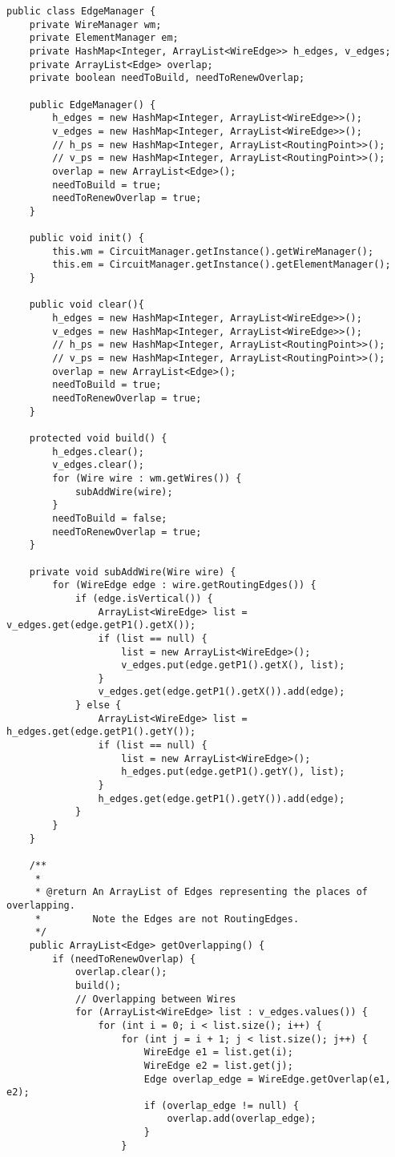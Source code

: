 \begin{lstlisting}[caption=EdgeManager, label=listing3]
 public class EdgeManager {
	private WireManager wm;
	private ElementManager em;
	private HashMap<Integer, ArrayList<WireEdge>> h_edges, v_edges;
	private ArrayList<Edge> overlap;
	private boolean needToBuild, needToRenewOverlap;

	public EdgeManager() {
		h_edges = new HashMap<Integer, ArrayList<WireEdge>>();
		v_edges = new HashMap<Integer, ArrayList<WireEdge>>();
		// h_ps = new HashMap<Integer, ArrayList<RoutingPoint>>();
		// v_ps = new HashMap<Integer, ArrayList<RoutingPoint>>();
		overlap = new ArrayList<Edge>();
		needToBuild = true;
		needToRenewOverlap = true;
	}

	public void init() {
		this.wm = CircuitManager.getInstance().getWireManager();
		this.em = CircuitManager.getInstance().getElementManager();
	}
	
	public void clear(){
		h_edges = new HashMap<Integer, ArrayList<WireEdge>>();
		v_edges = new HashMap<Integer, ArrayList<WireEdge>>();
		// h_ps = new HashMap<Integer, ArrayList<RoutingPoint>>();
		// v_ps = new HashMap<Integer, ArrayList<RoutingPoint>>();
		overlap = new ArrayList<Edge>();
		needToBuild = true;
		needToRenewOverlap = true;
	}

	protected void build() {
		h_edges.clear();
		v_edges.clear();
		for (Wire wire : wm.getWires()) {
			subAddWire(wire);
		}
		needToBuild = false;
		needToRenewOverlap = true;
	}

	private void subAddWire(Wire wire) {
		for (WireEdge edge : wire.getRoutingEdges()) {
			if (edge.isVertical()) {
				ArrayList<WireEdge> list = v_edges.get(edge.getP1().getX());
				if (list == null) {
					list = new ArrayList<WireEdge>();
					v_edges.put(edge.getP1().getX(), list);
				}
				v_edges.get(edge.getP1().getX()).add(edge);
			} else {
				ArrayList<WireEdge> list = h_edges.get(edge.getP1().getY());
				if (list == null) {
					list = new ArrayList<WireEdge>();
					h_edges.put(edge.getP1().getY(), list);
				}
				h_edges.get(edge.getP1().getY()).add(edge);
			}
		}
	}

	/**
	 * 
	 * @return An ArrayList of Edges representing the places of overlapping.
	 *         Note the Edges are not RoutingEdges.
	 */
	public ArrayList<Edge> getOverlapping() {
		if (needToRenewOverlap) {
			overlap.clear();
			build();
			// Overlapping between Wires
			for (ArrayList<WireEdge> list : v_edges.values()) {
				for (int i = 0; i < list.size(); i++) {
					for (int j = i + 1; j < list.size(); j++) {
						WireEdge e1 = list.get(i);
						WireEdge e2 = list.get(j);
						Edge overlap_edge = WireEdge.getOverlap(e1, e2);
						if (overlap_edge != null) {
							overlap.add(overlap_edge);
						}
					}


\end{lstlisting}
